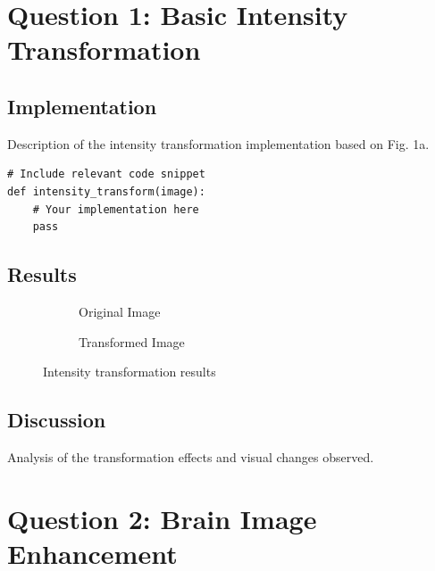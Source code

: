 \documentclass[12pt]{article}
\begin{document}

\newpage


\section{Question 1: Basic Intensity Transformation}
\subsection{Implementation}
Description of the intensity transformation implementation based on Fig. 1a.

\begin{lstlisting}
# Include relevant code snippet
def intensity_transform(image):
    # Your implementation here
    pass
\end{lstlisting}

\subsection{Results}
\begin{figure}[H]
    \centering
    \begin{subfigure}{0.45\textwidth}
        \fbox{\rule{0pt}{2in}\rule{2in}{0pt}}
        \caption{Original Image}
    \end{subfigure}
    \hfill
    \begin{subfigure}{0.45\textwidth}
        \fbox{\rule{0pt}{2in}\rule{2in}{0pt}}
        \caption{Transformed Image}
    \end{subfigure}
    \caption{Intensity transformation results}
\end{figure}

\subsection{Discussion}
Analysis of the transformation effects and visual changes observed.

\section{Question 2: Brain Image Enhancement}
\end{document}
